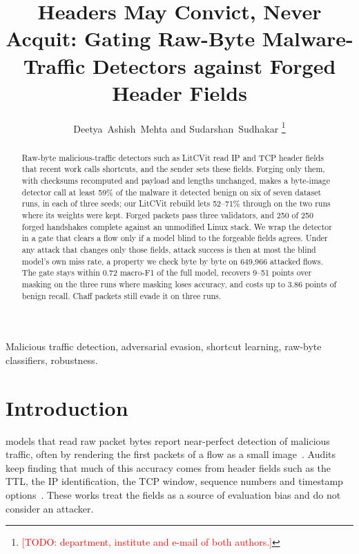 \documentclass[journal]{IEEEtran}
\newcommand{\todo}[1]{\textcolor{red}{[TODO: #1]}}
\begin{document}
\title{Headers May Convict, Never Acquit: Gating Raw-Byte Malware-Traffic Detectors against Forged Header Fields}

\author{Deetya~Ashish~Mehta and Sudarshan~Sudhakar%
\thanks{\todo{department, institute and e-mail of both authors.}}}

\maketitle

\begin{abstract}
Raw-byte malicious-traffic detectors such as LitCVit read IP and TCP header fields that recent work calls shortcuts, and the sender sets these fields. Forging only them, with checksums recomputed and payload and lengths unchanged, makes a byte-image detector call at least 59\% of the malware it detected benign on six of seven dataset runs, in each of three seeds; our LitCVit rebuild lets 52--71\% through on the two runs where its weights were kept. Forged packets pass three validators, and 250 of 250 forged handshakes complete against an unmodified Linux stack. We wrap the detector in a gate that clears a flow only if a model blind to the forgeable fields agrees. Under any attack that changes only those fields, attack success is then at most the blind model's own miss rate, a property we check byte by byte on 649{,}966 attacked flows. The gate stays within 0.72 macro-F1 of the full model, recovers 9--51 points over masking on the three runs where masking loses accuracy, and costs up to 3.86 points of benign recall. Chaff packets still evade it on three runs.
\end{abstract}

\begin{IEEEkeywords}
Malicious traffic detection, adversarial evasion, shortcut learning, raw-byte classifiers, robustness.
\end{IEEEkeywords}

\section{Introduction}

 models that read raw packet bytes report near-perfect detection of malicious traffic, often by rendering the first packets of a flow as a small image~\cite{wang2017ustc,zhao2023yatc,nisa2026litcvit}. Audits keep finding that much of this accuracy comes from header fields such as the TTL, the IP identification, the TCP window, sequence numbers and timestamp options~\cite{wickramasinghe2025sok,zhao2025sugar,wang2026shadows,yu2026shortcut}. These works treat the fields as a source of evaluation bias and do not consider an attacker.
\end{document}
